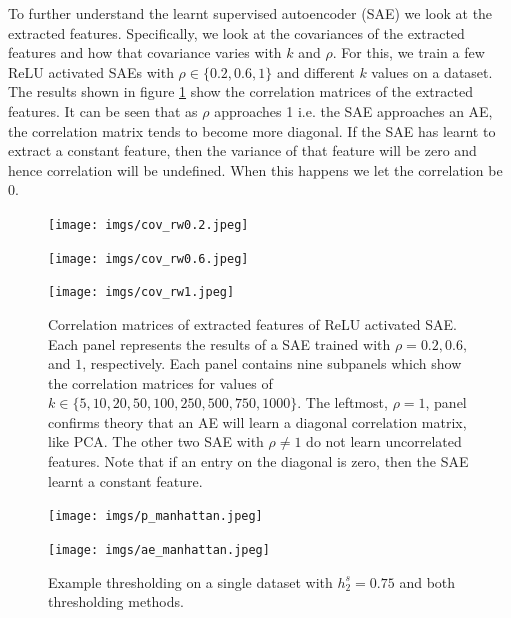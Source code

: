 \documentclass{article}
\begin{document}
To further understand the learnt supervised autoencoder (SAE) we look at the extracted features. Specifically, we look at the covariances of the extracted features and how that covariance varies with $k$ and $\rho.$ For this, we train a few ReLU activated SAEs with $\rho \in \{0.2, 0.6, 1\}$ and different $k$ values on a dataset. The results shown in figure \ref{fig:cov} show the correlation matrices of the extracted features. It can be seen that as $\rho$ approaches 1 i.e. the SAE approaches an AE, the correlation matrix tends to become more diagonal. If the SAE has learnt to extract a constant feature, then the variance of that feature will be zero and hence correlation will be undefined. When this happens we let the correlation be 0.

\begin{figure}[t]
    \centering
    \begin{minipage}{.333\textwidth}
        \centering
        \texttt{[image: imgs/cov\_rw0.2.jpeg]}
    \end{minipage}%
    \begin{minipage}{.333\textwidth}
        \centering
        \texttt{[image: imgs/cov\_rw0.6.jpeg]}
    \end{minipage}%
    \begin{minipage}{.333\textwidth}
        \centering
        \texttt{[image: imgs/cov\_rw1.jpeg]}
    \end{minipage}
    \caption{Correlation matrices of extracted features of ReLU activated SAE. Each panel represents the results of a SAE trained with $\rho=0.2, 0.6, $ and $1$, respectively. Each panel contains nine subpanels which show the correlation matrices for values of $k \in \{5, 10, 20, 50, 100, 250, 500, 750, 1000\}.$ The leftmost, $\rho=1$, panel confirms theory that an AE will learn a diagonal correlation matrix, like PCA. The other two SAE with $\rho \neq 1$ do not learn uncorrelated features. Note that if an entry on the diagonal is zero, then the SAE learnt a constant feature.}
    \label{fig:cov}
\end{figure}

\begin{figure}[t]
    \centering
    \begin{minipage}{.5\linewidth}
        \centering
        \texttt{[image: imgs/p\_manhattan.jpeg]}
    \end{minipage}%
    \begin{minipage}{.5\linewidth}
        \centering
        \texttt{[image: imgs/ae\_manhattan.jpeg]}        
    \end{minipage}
    \caption{Example thresholding on a single dataset with $h_2^s = 0.75$ and both thresholding methods. }
    \label{fig:manhattan}
\end{figure}
\end{document}
